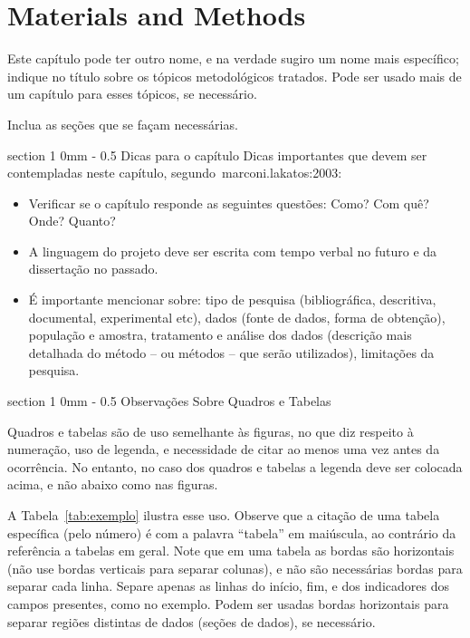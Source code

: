 \documentclass[a4paper, 12pt]{ppgeb}
\makeatletter
\renewcommand{\section}{\@startsection
{section}
{1}
{0mm}
{-\baselineskip}
{0.5\baselineskip}
{\large\bfseries\scshape}}
\makeatother
\begin{document}
\chapter{Materials and Methods}\label{chap:Metodologia}

Este capítulo pode ter outro nome, e na verdade sugiro um nome mais específico; indique no título sobre os tópicos metodológicos tratados. Pode ser usado mais de um capítulo para esses tópicos, se necessário.

Inclua as seções que se façam necessárias.

\section{Dicas para o capítulo}
Dicas importantes que devem ser contempladas neste capítulo, segundo~\cite{mainreferences}{marconi.lakatos:2003}:
\begin{itemize}
\item Verificar se o capítulo responde as seguintes questões: Como? Com quê? Onde? Quanto?
\item A linguagem do projeto deve ser escrita com tempo verbal no futuro e da dissertação no passado.
\item É importante mencionar sobre: tipo de pesquisa (bibliográfica, descritiva, documental, experimental etc), dados (fonte de dados, forma de obtenção), população e amostra, tratamento e análise dos dados (descrição mais detalhada do método -- ou métodos -- que serão utilizados), limitações da pesquisa.
\end{itemize}

\section{Observações Sobre Quadros e Tabelas}

Quadros e tabelas são de uso semelhante às figuras, no que diz respeito à numeração, uso de legenda, e necessidade de citar ao menos uma vez antes da ocorrência. No entanto, no caso dos quadros e tabelas a legenda deve ser colocada acima, e não abaixo como nas figuras.

A Tabela~\ref{tab:exemplo} ilustra esse uso. Observe que a citação de uma tabela específica (pelo número) é com a palavra ``tabela'' em maiúscula, ao contrário da referência a tabelas em geral. Note que em uma tabela as bordas são horizontais (não use bordas verticais para separar colunas), e não são necessárias bordas para separar cada linha. Separe apenas as linhas do início, fim, e dos indicadores dos campos presentes, como no exemplo. Podem ser usadas bordas horizontais para separar regiões distintas de dados (seções de dados), se necessário.
\end{document}
